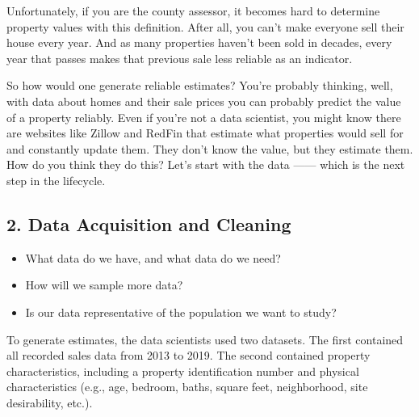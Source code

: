 \documentclass[
  letterpaper,
  DIV=11,
  numbers=noendperiod]{scrreprt}
\providecommand{\tightlist}{%
  \setlength{\itemsep}{0pt}\setlength{\parskip}{0pt}}\usepackage{longtable,booktabs,array}
\begin{document}
Unfortunately, if you are the county assessor, it becomes hard to
determine property values with this definition. After all, you can't
make everyone sell their house every year. And as many properties
haven't been sold in decades, every year that passes makes that previous
sale less reliable as an indicator.

So how would one generate reliable estimates? You're probably thinking,
well, with data about homes and their sale prices you can probably
predict the value of a property reliably. Even if you're not a data
scientist, you might know there are websites like Zillow and RedFin that
estimate what properties would sell for and constantly update them. They
don't know the value, but they estimate them. How do you think they do
this? Let's start with the data ------ which is the next step in the
lifecycle.

\subsection{2. Data Acquisition and
Cleaning}\label{data-acquisition-and-cleaning}

\begin{tcolorbox}[enhanced jigsaw, coltitle=black, leftrule=.75mm, left=2mm, bottomrule=.15mm, bottomtitle=1mm, opacityback=0, breakable, arc=.35mm, opacitybacktitle=0.6, toptitle=1mm, title=\textcolor{quarto-callout-note-color}{\faInfo}\hspace{0.5em}{Driving Questions}, colbacktitle=quarto-callout-note-color!10!white, titlerule=0mm, rightrule=.15mm, colframe=quarto-callout-note-color-frame, toprule=.15mm, colback=white]

\begin{itemize}
\tightlist
\item
  What data do we have, and what data do we need?
\item
  How will we sample more data?
\item
  Is our data representative of the population we want to study?
\end{itemize}

\end{tcolorbox}

To generate estimates, the data scientists used two datasets. The first
contained all recorded sales data from 2013 to 2019. The second
contained property characteristics, including a property identification
number and physical characteristics (e.g., age, bedroom, baths, square
feet, neighborhood, site desirability, etc.).
\end{document}
